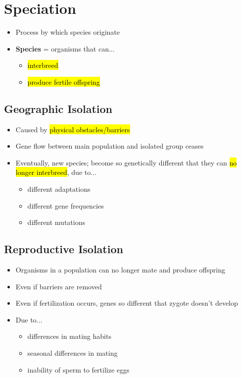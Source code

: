 \documentclass[a4paper,12pt]{article}
\begin{document}
\section{Speciation}
\begin{itemize}
    \item{Process by which species originate}
    \item{
            \textbf{Species} = organisms that can...
            \begin{itemize}
                \item{\hl{interbreed}}
                \item{\hl{produce fertile offspring}}
            \end{itemize}
        }
\end{itemize}

\subsection{Geographic Isolation}
\begin{itemize}
    \item{Caused by \hl{physical obstacles/barriers}}
    \item{Gene flow between main population and isolated group ceases}
    \item{
            Eventually, new species; become so genetically different that they can \hl{no longer interbreed}, due to...
            \begin{itemize}
                \item{different adaptations}
                \item{different gene frequencies}
                \item{different mutations}
            \end{itemize}
        }
\end{itemize}

\subsection{Reproductive Isolation}
\begin{itemize}
    \item{Organisms in a population can no longer mate and produce offspring}
    \item{Even if barriers are removed}
    \item{Even if fertilization occurs, genes so different that zygote doesn't develop}
    \item{
            Due to...
            \begin{itemize}
                \item{differences in mating habits}
                \item{seasonal differences in mating}
                \item{inability of sperm to fertilize eggs}
            \end{itemize}
        }
\end{itemize}
\end{document}
